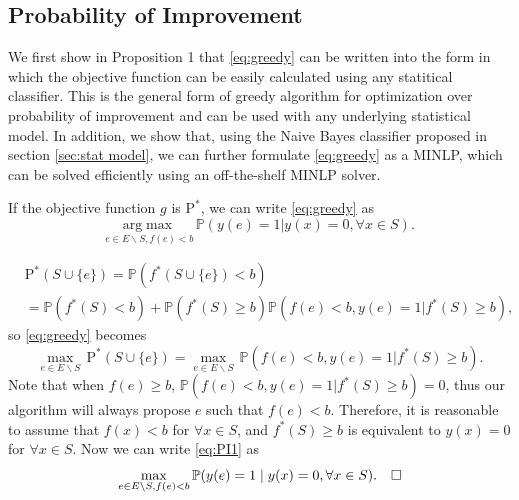 \documentclass[opre,nonblindrev]{informs3} %
\newcommand{\PI}{\text{P}^*}
\begin{document}
\subsection{Probability of Improvement}
We first show in Proposition 1 that \eqref{eq:greedy} can be written into the form in which the objective function can be easily calculated using any statitical classifier. This is the general form of greedy algorithm for optimization over probability of improvement and can be used with any underlying statistical model. In addition, we show that, using the Naive Bayes classifier proposed in section \ref{sec:stat model}, we can further formulate \eqref{eq:greedy} as a MINLP, which can be solved efficiently using an off-the-shelf MINLP solver.
\begin{proposition}
  If the objective function $g$ is $\PI$, we can write \eqref{eq:greedy} as 
  \begin{equation} \label{eq:PI3}
    \underset{e \in E \backslash S, f(e)<b}{\mathrm{arg}\max} \, \mathbb{P}(y(e)=1|y(x)=0, \forall x \in S).
  \end{equation}
\end{proposition}
  \begin{equation*}
    \begin{split}
      &\PI(S \cup \{e\}) = \mathbb{P}(f^*(S\cup \{e\})<b)\\
      &= \mathbb{P}(f^*(S)<b) + \mathbb{P}(f^*(S)\geq b) \mathbb{P}(f(e)<b, y(e)=1|f^*(S)\geq b),
    \end{split}
  \end{equation*}
  so \eqref{eq:greedy} becomes
  \begin{equation} \label{eq:PI1} 
    \underset{e \in E \backslash S}{\max} \, \PI(S \cup \{e\}) = \underset{e \in E \backslash S}{\max} \, \mathbb{P}(f(e)<b, y(e)=1|f^*(S)\geq b).
  \end{equation}
  Note that when $f(e) \geq b$, $\mathbb{P}(f(e)<b, y(e)=1|f^*(S)\geq b)=0$, thus our algorithm will always propose $e$ such that $f(e)<b$. Therefore, it is reasonable to assume that $f(x)<b$ for $\forall x \in S$, and $f^*(S)\geq b$ is equivalent to $y(x)=0$ for $\forall x \in S$. Now we can write \eqref{eq:PI1} as 
  \begin{equation*}
    \underset{e \in E \backslash S, f(e) < b}{\max} \, \mathbb{P} (y(e) = 1 \mid y(x) = 0, \forall x \in S). \mbox{\quad$\square$}
  \end{equation*}
\endproof
\end{document}
